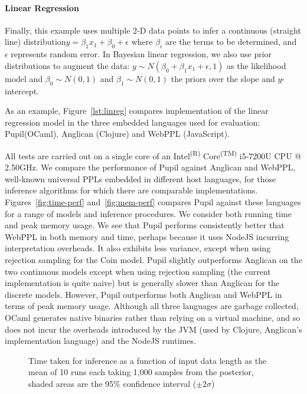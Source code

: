 \documentclass[sigconf]{acmart}
\newcommand{\pupil}{Pupil\xspace}
\begin{document}
\paragraph{Linear Regression}
Finally, this example uses multiple 2-D data points to infer a continuous (straight line) distribution$ y=\beta_1 x_1 + \beta_0 + \epsilon$ where  $\beta_i$ are the terms to be determined, and $\epsilon$ represents random error. In Bayesian linear regression, we also use prior distributions to augment the data:   $y \sim N(\beta_0 + \beta_1 x_1 + \epsilon, 1)$ as the likelihood model and $\beta_0 \sim N(0,1)$ and $\beta_1 \sim N(0,1)$ the priors over the slope and $y$-intercept.

As an example, Figure~\ref{lst:linreg} compares implementation of the linear regression model in the three embedded languages used for evaluation: \pupil (OCaml), Anglican (Clojure) and WebPPL (JavaScript).

All tests are carried out on a single core of an Intel\textsuperscript{(R)} Core\textsuperscript{(TM)} i5-7200U CPU @ 2.50GHz. We compare the performance of \pupil against Anglican and WebPPL, well-known universal PPLs embedded in different host languages, for those inference algorithms for which there are comparable implementations. Figures~\ref{fig:time-perf} and~\ref{fig:mem-perf} compares \pupil against these languages for a range of models and inference procedures. We consider both running time and peak memory usage. We see that \pupil performs consistently better that WebPPL in both memory and time, perhaps because it uses NodeJS incurring interpretation overheads. It also exhibits less variance, except when using rejection sampling for the Coin model. \pupil slightly outperforms Anglican on the two continuous models except when using rejection sampling (the current implementation is quite naive) but is generally slower than Anglican for the discrete models. However, \pupil outperforms both Anglican and WebPPL in terms of peak memory usage. Although all three languages are garbage collected, OCaml generates native binaries rather than relying on a virtual machine, and so does not incur the overheads introduced by the JVM (used by Clojure, Anglican's implementation language) and the NodeJS runtimes.

\begin{figure}
  \centering
  
  \caption{\label{fig:time-datasize}
    Time taken for inference as a function of input data length as the mean of 10 runs each taking 1,000 samples from the posterior, shaded areas are the 95\% confidence interval ($\pm 2\sigma$)}
\end{figure}
\end{document}
